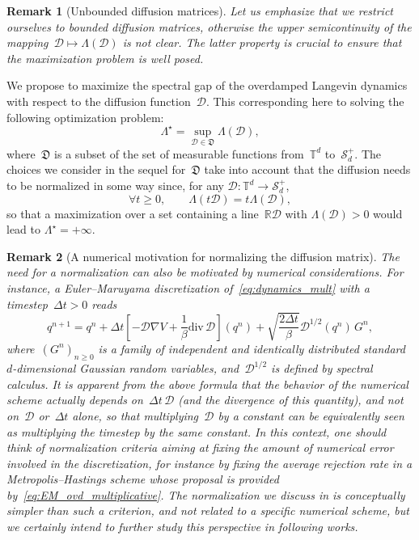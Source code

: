 \documentclass{article}
\newtheorem{remark}{Remark}
\newcommand{\R}{\mathbb{R}}
\renewcommand{\geq}{\geqslant}
\def\R{\mathbb{R}}
\def\T{\mathbb{T}}
\newcommand{\Diff}{\mathcal{D}}
\newcommand{\Diffset}{\mathfrak{D}}
\renewcommand{\dim}{d}
\begin{document}
\begin{remark}[Unbounded diffusion matrices]
  Let us emphasize that we restrict ourselves to bounded diffusion matrices, otherwise the upper semicontinuity of the mapping~$\Diff \mapsto \Lambda(\Diff)$ is not clear. The latter property is crucial to ensure that the maximization problem is well posed.
\end{remark}

We propose to maximize the spectral gap of the overdamped Langevin dynamics with respect to the diffusion function~$\Diff$. This corresponding here to solving the following optimization problem:
\begin{equation}
\label{eq:optim-continuous-init}
\Lambda^{\star} = \sup_{\Diff\in\Diffset}\Lambda(\Diff),
\end{equation}
where~$\Diffset$ is a subset of the set of measurable functions from~$\T^\dim$ to~$\mathcal{S}_\dim^{+}$. The choices we consider in the sequel for~$\Diffset$ take into account that the diffusion needs to be normalized in some way since, for any $\Diff:\T^\dim\rightarrow\mathcal{S}_\dim^{+}$,
\begin{equation}
  \label{eq:t_Lambda_scaling}
  \forall t\geq 0, \qquad \Lambda(t \Diff) = t\Lambda(\Diff),
\end{equation}
so that a maximization over a set containing a line~$\R \Diff$ with $\Lambda(\Diff) > 0$ would lead to $\Lambda^{\star} = +\infty$.

\begin{remark}[A numerical motivation for normalizing the diffusion matrix]
  \label{rmk:normalization_numerics}
  The need for a normalization can also be motivated by numerical considerations. For instance, a Euler--Maruyama discretization of~\eqref{eq:dynamics_mult} with a timestep~$\Delta t>0$ reads
  \begin{equation}
    \label{eq:EM_ovd_multiplicative}
    q^{n+1} = q^n + \Delta t \left[- \Diff \nabla V + \frac1\beta \mathrm{div}\,\Diff \right](q^n) + \sqrt{\frac{2\Delta t}{\beta}} \Diff^{1/2}(q^n) \, G^n,
  \end{equation}
  where~$(G^n)_{n \geq 0}$ is a family of independent and identically distributed standard $d$-dimensional Gaussian random variables, and~$\Diff^{1/2}$ is defined by spectral calculus. It is apparent from the above formula that the behavior of the numerical scheme actually depends on~$\Delta t \, \Diff$ (and the divergence of this quantity), and not on~$\Diff$ or~$\Delta t$ alone, so that multiplying~$\Diff$ by a constant can be equivalently seen as multiplying the timestep by the same constant. In this context, one should think of normalization criteria aiming at fixing the amount of numerical error involved in the discretization, for instance by fixing the average rejection rate in a Metropolis--Hastings scheme whose proposal is provided by~\eqref{eq:EM_ovd_multiplicative}. The normalization we discuss in  is conceptually simpler than such a criterion, and not related to a specific numerical scheme, but we certainly intend to further study this perspective in following works.
\end{remark}
\end{document}
